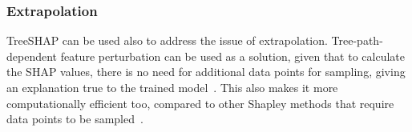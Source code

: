 \subsubsection{Extrapolation}
TreeSHAP can be used also to address the issue of extrapolation.
Tree-path-dependent feature perturbation can be used as a solution, given that to calculate the SHAP values, there is no need for additional data points for sampling, giving an explanation true to the trained model~\cite{CoRR2020}. %
This also makes it more computationally efficient too, compared to other Shapley methods that require data points to be sampled~\cite{Lundberg2020, Molnar2022}. %



